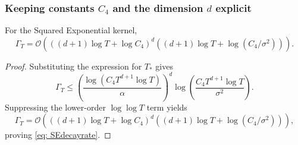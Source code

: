 \subsubsection{Keeping constants $C_4$ and the dimension $d$ explicit}

\begin{proposition}
For the Squared Exponential kernel,
\begin{equation}
\Gamma_T
=
\mathcal{O}
\left(
\left(
(d+1)\log T+\log C_4
\right)^d
\left(
(d+1)\log T+\log(C_4/\sigma^2)
\right)
\right).
\label{eq: SEdecayrate}
\end{equation}
\end{proposition}

\begin{proof}
Substituting the expression for $T_*$ gives
\begin{equation*}
\Gamma_T
\leq
\left(
\frac{
\log(C_4T^{d+1}\log T)
}{\alpha}
\right)^d
\log\!\left(
\frac{C_4T^{d+1}\log T}{\sigma^2}
\right).
\end{equation*}
Suppressing the lower-order $\log\log T$ term yields
\begin{equation*}
\Gamma_T
=
\mathcal{O}
\left(
\left(
(d+1)\log T+\log C_4
\right)^d
\left(
(d+1)\log T+\log(C_4/\sigma^2)
\right)
\right),
\end{equation*}
proving \eqref{eq: SEdecayrate}.
\end{proof}

